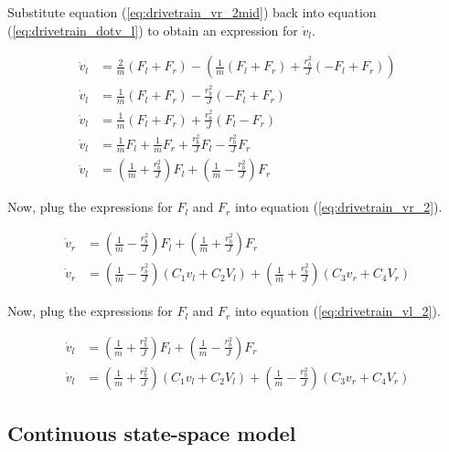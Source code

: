 Substitute equation (\ref{eq:drivetrain_vr_2mid}) back into equation
(\ref{eq:drivetrain_dotv_l}) to obtain an expression for $\dot{v}_l$.

\begin{align}
  \dot{v}_l &= \frac{2}{m} (F_l + F_r) - \left(\frac{1}{m} (F_l + F_r) +
    \frac{r_b^2}{J} (-F_l + F_r)\right) \nonumber \\
  \dot{v}_l &= \frac{1}{m} (F_l + F_r) - \frac{r_b^2}{J} (-F_l + F_r)
    \nonumber \\
  \dot{v}_l &= \frac{1}{m} (F_l + F_r) + \frac{r_b^2}{J} (F_l - F_r) \nonumber
    \\
  \dot{v}_l &= \frac{1}{m} F_l + \frac{1}{m} F_r + \frac{r_b^2}{J} F_l -
    \frac{r_b^2}{J} F_r \nonumber \\
  \dot{v}_l &= \left(\frac{1}{m} + \frac{r_b^2}{J}\right) F_l +
    \left(\frac{1}{m} - \frac{r_b^2}{J}\right) F_r \label{eq:drivetrain_vl_2}
\end{align}

Now, plug the expressions for $F_l$ and $F_r$ into equation
(\ref{eq:drivetrain_vr_2}).

\begin{align}
  \dot{v}_r &= \left(\frac{1}{m} - \frac{r_b^2}{J}\right) F_l +
    \left(\frac{1}{m} + \frac{r_b^2}{J}\right) F_r \nonumber \\
  \dot{v}_r &= \left(\frac{1}{m} - \frac{r_b^2}{J}\right)
    \left(C_1 v_l + C_2 V_l\right) +
    \left(\frac{1}{m} + \frac{r_b^2}{J}\right) \left(C_3 v_r + C_4 V_r\right)
    \label{eq:drivetrain_model_left}
\end{align}

Now, plug the expressions for $F_l$ and $F_r$ into equation
(\ref{eq:drivetrain_vl_2}).

\begin{align}
  \dot{v}_l &= \left(\frac{1}{m} + \frac{r_b^2}{J}\right) F_l +
    \left(\frac{1}{m} - \frac{r_b^2}{J}\right) F_r \nonumber \\
  \dot{v}_l &= \left(\frac{1}{m} + \frac{r_b^2}{J}\right)
    \left(C_1 v_l + C_2 V_l\right) +
    \left(\frac{1}{m} - \frac{r_b^2}{J}\right) \left(C_3 v_r + C_4 V_r\right)
    \label{eq:drivetrain_model_right}
\end{align}

\subsection{Continuous state-space model}

